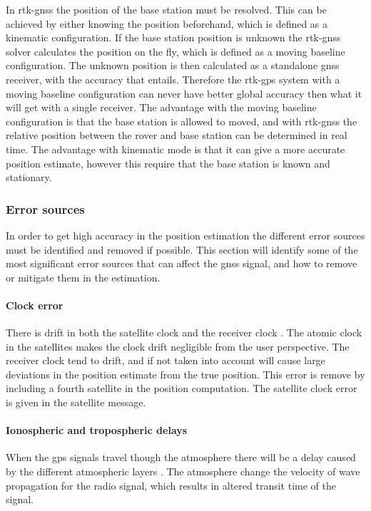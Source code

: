 In \gls{rtk-gnss} the position of the base station must be resolved. This can be achieved by either knowing the position beforehand, which is defined as a kinematic configuration. If the base station position is unknown the \gls{rtk-gnss} solver calculates the position on the fly, which is defined as a moving baseline configuration. The unknown position is then calculated as a standalone \gls{gnss} receiver, with the accuracy that entails. Therefore the \gls{rtk-gps} system with a moving baseline configuration can never have better global accuracy then what it will get with a single receiver. The advantage with the moving baseline configuration is that the base station is allowed to moved, and with \gls{rtk-gnss} the relative position between the rover and base station can be determined in real time. The advantage with kinematic mode is that it can give a more accurate position estimate, however this require that the base station is known and stationary.
\subsubsection{Error sources}
In order to get high accuracy in the position estimation the different error sources must be identified and removed if possible. This section will identify some of the most significant error sources that can affect the \gls{gnss} signal, and how to remove or mitigate them in the estimation.
\paragraph{Clock error}
There is drift in both the satellite clock and the receiver clock \citep{misra2011global}. The atomic clock in the satellites makes the clock drift negligible from the user perspective. The receiver clock tend to drift, and if not taken into account will cause large deviations in the position estimate from the true position. This error is remove by including a fourth satellite in the position computation. The satellite clock error is given in the satellite message.
\paragraph{Ionospheric and tropospheric delays}\label{Ss:Atmosphere}
When the \gls{gps} signals travel though the atmosphere there will be a delay caused by the different atmospheric layers \citep{misra2011global}. The atmosphere change the velocity of wave propagation for the radio signal, which results in altered transit time of the signal.
